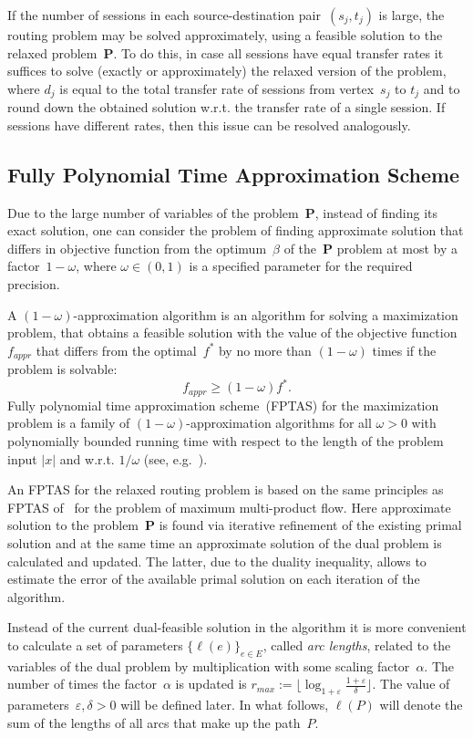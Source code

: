 \documentclass{ifacconf}
\begin{document}
If the number of sessions in each source-destination pair~$(s_j,t_j)$ is large,
the routing problem may be solved approximately, using a feasible solution to the relaxed problem~{\bf P}. To do this,  in case all
sessions have equal transfer rates it suffices to solve (exactly or approximately) the relaxed version of the problem, where $d_j$ is equal to the 
total transfer rate of sessions from vertex~$s_j$ to $t_j$ and to round down the obtained solution w.r.t. the transfer rate of a single session. If sessions have different rates, then this issue can be resolved analogously.



\subsection{Fully Polynomial Time Approximation Scheme}
\label{FPTAS}

Due to the large number of variables  of the problem~{\bf P}, instead of finding
its exact solution, one can consider the problem of finding
approximate solution that differs in objective function from
the optimum~$\beta$ of the~{\bf P} problem at most by a factor~$1-\omega$,
where $\omega \in (0,1)$ is a specified parameter for the required precision.

A $(1-\omega)$-approximation algorithm is an algorithm for solving a maximization problem,
 that obtains a feasible solution with the value of the objective
function~$f_{appr}$ that differs from the optimal~$f^*$ by no more than
$(1-\omega)$ times if the problem is solvable:
$$
f_{appr} \ge (1-\omega) f^*.
$$
Fully polynomial time approximation scheme~(FPTAS) for the maximization problem
 is a family of $(1-\omega)$-approximation algorithms for all $\omega>0$ with polynomially bounded running time
with respect to the length of the problem input $|x|$ and w.r.t. $1/\omega$ (see,
e.g.~\cite{GJ}).

An FPTAS for the relaxed routing problem is based on
the same principles as FPTAS of~\cite{Fleis2000} for the problem of
maximum multi-product flow.
Here approximate solution to the problem~{\bf P} is found via
iterative refinement of the existing primal solution and at the same time
an approximate solution of the dual problem is calculated and updated.
The latter, due to the duality inequality, allows to estimate the error of the available primal
solution on each
iteration of the algorithm.

Instead of the current dual-feasible solution in the algorithm
it is more convenient to calculate a set of parameters $\{\ell(e)\}_{e\in E}$,
called {\em arc lengths}, related to
the variables of the dual problem by multiplication
with some scaling factor~$\alpha$. The number of times the factor~$\alpha$ is updated is
$r_{max}:=\lfloor \log_{1+\varepsilon}
 \frac{1+\varepsilon}{\delta}\rfloor$. The value of parameters~$\varepsilon, \delta>0$ will be
defined later. In what follows, $\ell(P)$
will denote the sum of the lengths of all arcs that make up the path~$P.$
\end{document}
